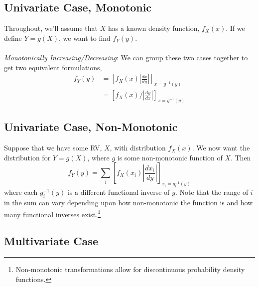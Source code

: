 \documentclass[a4paper,12pt]{scrartcl}
\begin{document}
\subsection{Univariate Case, Monotonic}

Throughout, we'll assume that $X$ has a known density function, 
$f_X(x)$. If we define $Y = g(X)$, we want to find $f_Y(y)$.
\\
\\
{\sl Monotonically Increasing/Decreasing}: We can group these two
cases together to get two equivalent formulations,
\begin{align*}
   f_Y(y) &= \left[f_X(x) \left\lvert \frac{dx}{dy}\right\rvert
      \right]_{x = g^{-1}(y)} \\
      &= \left[ f_X(x) / \left\lvert \frac{dy}{dx}\right\rvert
      \right]_{x = g^{-1}(y)}
\end{align*}


\subsection{Univariate Case, Non-Monotonic}

Suppose that we have some RV, $X$, with distribution $f_X(x)$. 
We now want the distribution for $Y=g(X)$, where $g$ is some 
non-monotonic function of $X$. Then
\begin{equation}
   \label{nonmontrans}
   f_Y(y) = \sum_i \left[ f_X(x_i) \left\lvert \frac{dx_i}{dy}
      \right\rvert \right]_{x_i=g_i^{-1}(y)} 
\end{equation}
where each $g_i^{-1}(y)$ is a different functional inverse of $y$.
Note that the range of $i$ in the sum can vary depending upon 
how non-monotonic the function is and how many functional inverses
exist.\footnote{Non-monotonic transformations allow for discontinuous
probability density functions.}

\subsection{Multivariate Case}
\end{document}
